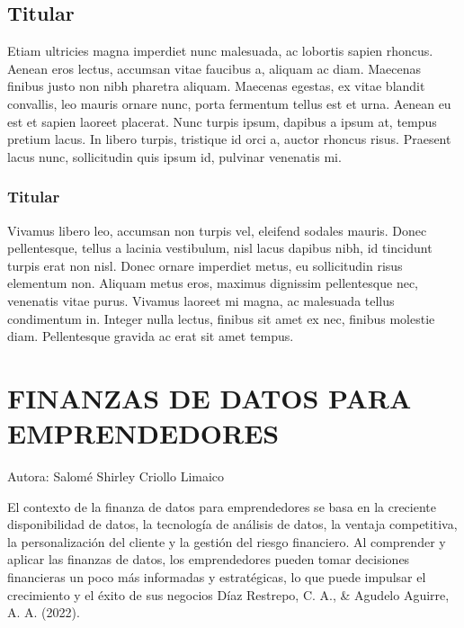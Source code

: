 \documentclass[
  letterpaper,
  DIV=11,
  numbers=noendperiod]{scrreprt}
\begin{document}
\hypertarget{titular-2}{%
\section{Titular}\label{titular-2}}

Etiam ultricies magna imperdiet nunc malesuada, ac lobortis sapien
rhoncus. Aenean eros lectus, accumsan vitae faucibus a, aliquam ac diam.
Maecenas finibus justo non nibh pharetra aliquam. Maecenas egestas, ex
vitae blandit convallis, leo mauris ornare nunc, porta fermentum tellus
est et urna. Aenean eu est et sapien laoreet placerat. Nunc turpis
ipsum, dapibus a ipsum at, tempus pretium lacus. In libero turpis,
tristique id orci a, auctor rhoncus risus. Praesent lacus nunc,
sollicitudin quis ipsum id, pulvinar venenatis mi.

\hypertarget{titular-3}{%
\subsection{Titular}\label{titular-3}}

Vivamus libero leo, accumsan non turpis vel, eleifend sodales mauris.
Donec pellentesque, tellus a lacinia vestibulum, nisl lacus dapibus
nibh, id tincidunt turpis erat non nisl. Donec ornare imperdiet metus,
eu sollicitudin risus elementum non. Aliquam metus eros, maximus
dignissim pellentesque nec, venenatis vitae purus. Vivamus laoreet mi
magna, ac malesuada tellus condimentum in. Integer nulla lectus, finibus
sit amet ex nec, finibus molestie diam. Pellentesque gravida ac erat sit
amet tempus.


\hypertarget{finanzas-de-datos-para-emprendedores}{%
\chapter{FINANZAS DE DATOS PARA
EMPRENDEDORES}\label{finanzas-de-datos-para-emprendedores}}

Autora: Salomé Shirley Criollo Limaico

El contexto de la finanza de datos para emprendedores se basa en la
creciente disponibilidad de datos, la tecnología de análisis de datos,
la ventaja competitiva, la personalización del cliente y la gestión del
riesgo financiero. Al comprender y aplicar las finanzas de datos, los
emprendedores pueden tomar decisiones financieras un poco más informadas
y estratégicas, lo que puede impulsar el crecimiento y el éxito de sus
negocios Díaz Restrepo, C. A., \& Agudelo Aguirre, A. A. (2022).
\end{document}
